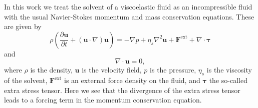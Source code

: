 In this work we treat the solvent of a viscoelastic fluid as an incompressible fluid with the usual Navier-Stokes momentum and mass conservation equations. These are given by
\begin{equation}\label{eq:momentum_conservation}
\rho \left( \frac{\partial \bm{u}}{\partial t} + \left(\bm{u} \cdot \nabla\right)\bm{u}\right) =
-\nabla p +\eta_s \nabla^2 \bm{u} + \bm{F}^{\mathrm{ext}} + \nabla \cdot \bm{\tau} 
\end{equation}
and
\begin{equation}\label{eq:mass_conservation}
\nabla \cdot \bm{u} = 0,
\end{equation}
where $\rho$ is the density, $\bm{u}$ is the velocity field, $p$ is the pressure, $\eta_s$ is the viscosity of the solvent, $\bm{F}^{\mathrm{ext}}$ is an external force density on the fluid, and $\bm{\tau}$ the so-called extra stress tensor. Here we see that the divergence of the extra stress tensor leads to a forcing term in the momentum conservation equation. 

